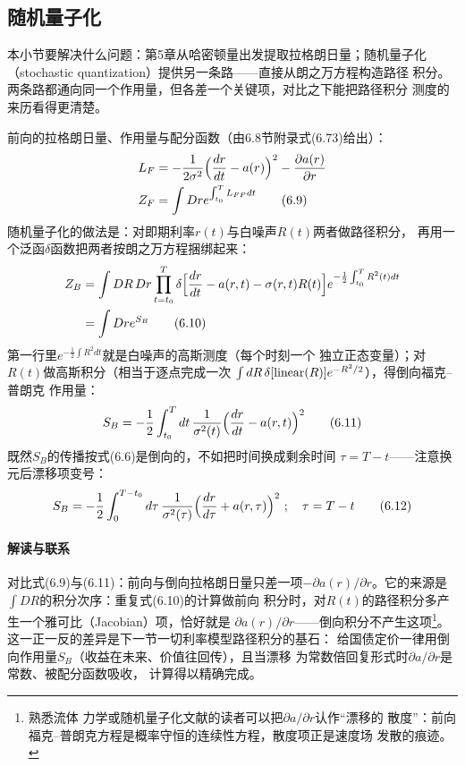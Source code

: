 \subsection{随机量子化}

本小节要解决什么问题：第5章从哈密顿量出发提取拉格朗日量；随机量子化
（stochastic quantization）提供另一条路——直接从朗之万方程构造路径
积分。两条路都通向同一个作用量，但各差一个关键项，对比之下能把路径积分
测度的来历看得更清楚。

前向的拉格朗日量、作用量与配分函数（由6.8节附录式(6.73)给出）：
\begin{align*}
L_F&=-\frac{1}{2\sigma^2}\Bigl(\frac{dr}{dt}-a(r)\Bigr)^2
-\frac{\partial a(r)}{\partial r}\\
Z_F&=\int Dre^{\int_{t_0}^{T}L_{FP}dt}
\tag{6.9}
\end{align*}
随机量子化的做法是：对即期利率$r(t)$与白噪声$R(t)$两者做路径积分，
再用一个泛函$\delta$函数把两者按朗之万方程捆绑起来：
\begin{align*}
Z_B&=\int DR\,Dr\prod_{t=t_0}^{T}\delta\Bigl[\frac{dr}{dt}
-a(r,t)-\sigma(r,t)R(t)\Bigr]e^{-\frac{1}{2}\int_{t_0}^{T}R^2(t)dt}\\
&=\int Dre^{S_B}
\tag{6.10}
\end{align*}
第一行里$e^{-\frac{1}{2}\int R^2dt}$就是白噪声的高斯测度（每个时刻一个
独立正态变量）；对$R(t)$做高斯积分（相当于逐点完成一次
$\int dR\,\delta[{\rm linear}(R)]e^{-R^2/2}$），得倒向福克--普朗克
作用量：
\begin{equation*}
S_B=-\frac{1}{2}\int_{t_0}^{T}dt\,\frac{1}{\sigma^2(t)}
\Bigl(\frac{dr}{dt}-a(r,t)\Bigr)^2
\tag{6.11}
\end{equation*}
既然$S_B$的传播按式(6.6)是倒向的，不如把时间换成剩余时间
$\tau=T-t$——注意换元后漂移项变号：
\begin{equation*}
S_B=-\frac{1}{2}\int_{0}^{T-t_0}d\tau\,\frac{1}{\sigma^2(\tau)}
\Bigl(\frac{dr}{d\tau}+a(r,\tau)\Bigr)^2\ ;\quad\tau=T-t
\tag{6.12}
\end{equation*}

\paragraph{解读与联系}
对比式(6.9)与(6.11)：前向与倒向拉格朗日量只差一项$-\partial a(r)/
\partial r$。它的来源是$\int DR$的积分次序：重复式(6.10)的计算做前向
积分时，对$R(t)$的路径积分多产生一个雅可比（Jacobian）项，恰好就是
$\partial a(r)/\partial r$——倒向积分不产生这项\footnote{熟悉流体
力学或随机量子化文献的读者可以把$\partial a/\partial r$认作“漂移的
散度”：前向福克--普朗克方程是概率守恒的连续性方程，散度项正是速度场
发散的痕迹。}。这一正一反的差异是下一节一切利率模型路径积分的基石：
给国债定价一律用倒向作用量$S_B$（收益在未来、价值往回传），且当漂移
为常数倍回复形式时$\partial a/\partial r$是常数、被配分函数吸收，
计算得以精确完成。


